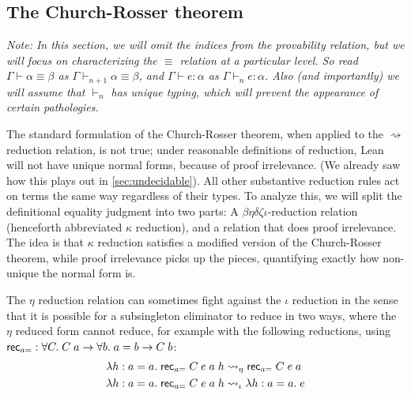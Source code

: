 \subsection{The Church-Rosser theorem}\label{sec:church_rosser}
\emph{Note: In this section, we will omit the indices from the provability relation, but we will focus on characterizing the $\equiv$ relation at a particular level. So read $\Gamma\vdash \alpha\equiv\beta$ as $\Gamma\vdash_{n+1} \alpha\equiv\beta$, and $\Gamma\vdash e:\alpha$ as $\Gamma\vdash_n e:\alpha$. Also (and importantly) we will assume that $\vdash_n$ has unique typing, which will prevent the appearance of certain pathologies.}

The standard formulation of the Church-Rosser theorem, when applied to the $\rightsquigarrow$ reduction relation, is not true; under reasonable definitions of reduction, Lean will not have unique normal forms, because of proof irrelevance. (We already saw how this plays out in \autoref{sec:undecidable}). All other substantive reduction rules act on terms the same way regardless of their types. To analyze this, we will split the definitional equality judgment into two parts: A $\beta\eta\delta\zeta\iota$-reduction relation (henceforth abbreviated $\kappa$ reduction), and a relation that does proof irrelevance. The idea is that $\kappa$ reduction satisfies a modified version of the Church-Rosser theorem, while proof irrelevance picks up the pieces, quantifying exactly how non-unique the normal form is.

The $\eta$ reduction relation can sometimes fight against the $\iota$ reduction in the sense that it is possible for a subsingleton eliminator to reduce in two ways, where the $\eta$ reduced form cannot reduce, for example with the following reductions, using $\mathsf{rec}_{a=}:\forall C.\;C\;a\to \forall b.\;a=b\to C\;b$:
\begin{align*}
&\lambda h:a=a.\;\mathsf{rec}_{a=}\;C\;e\;a\;h\rightsquigarrow_\eta\mathsf{rec}_{a=}\;C\;e\;a\\
&\lambda h:a=a.\;\mathsf{rec}_{a=}\;C\;e\;a\;h\rightsquigarrow_\iota\lambda h:a=a.\;e
\end{align*}

